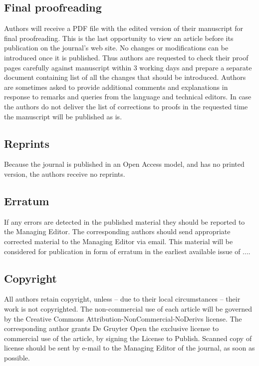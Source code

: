 \documentclass[USenglish,oneside,twocolumn]{article}
\begin{document}
\subsection{Final proofreading}

Authors will receive a PDF file with the edited version of their manuscript for final proofreading. This is the last opportunity to view an article before its publication on the journal's web site. No changes or modifications can be introduced once it is published. Thus authors are requested to check their proof pages carefully against manuscript within 3 working days and prepare a separate document containing list of all the changes that should be introduced. Authors are sometimes asked to provide additional comments and explanations in response to remarks and queries from the language and technical editors. In case the authors do not deliver the list of corrections to proofs in the requested time the manuscript will be published as is.

 

\subsection{Reprints}

Because the journal is published in an Open Access model, and has no printed version, the authors receive no reprints.

\subsection{Erratum}

If any errors are detected in the published material they should be reported to the Managing Editor. The corresponding authors should send appropriate corrected material to the Managing Editor via email. This material will be considered for publication in form of erratum in the earliest available issue of ....

\subsection{Copyright  }

All authors retain copyright, unless -- due to their local circumstances -- their work is not copyrighted. The non-commercial use of each article will be governed by the Creative Commons Attribution-NonCommercial-NoDerivs license. The corresponding author grants De Gruyter Open the exclusive license to commercial use of the article, by signing the License to Publish. Scanned copy of license should be sent by e-mail to the Managing Editor of the journal, as soon as possible.
\end{document}
